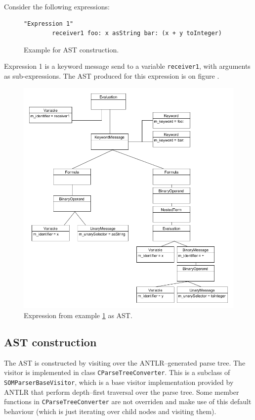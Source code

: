 \documentclass[thesis=M,english]{FITthesis}[2019/12/23]
\begin{document}
Consider the following expressions:
\begin{figure}[h!]
	\centering
	\begin{lstlisting}[language=Smalltalk]
		"Expression 1"
		receiver1 foo: x asString bar: (x + y toInteger) 
	\end{lstlisting}
	\caption{Example for AST construction.}
	\label{fig:ast_constr_ex}
\end{figure}

Expression 1 is a keyword message send to a variable \texttt{receiver1}, with arguments as sub-expressions. The AST produced for this expression is
on figure .

\begin{figure}[h!]
	\centering
	\includegraphics[width=\textwidth]{media/exp_ast_1.png}
	\caption{Expression from example \ref{fig:ast_constr_ex} as AST.}
	\label{fig:ast_const_ex_1}
\end{figure}

\subsection{AST construction}
The AST is constructed by visiting over the ANTLR--generated parse tree. The visitor is implemented in class \texttt{CParseTreeConverter}. This is a subclass
of \texttt{SOMParserBaseVisitor}, which is a base visitor implementation provided by ANTLR that perform depth--first traversal over the parse tree. Some member
functions in \texttt{CParseTreeConverter} are not overriden and make use of this default behaviour (which is just iterating over child nodes and visiting them).
\end{document}

